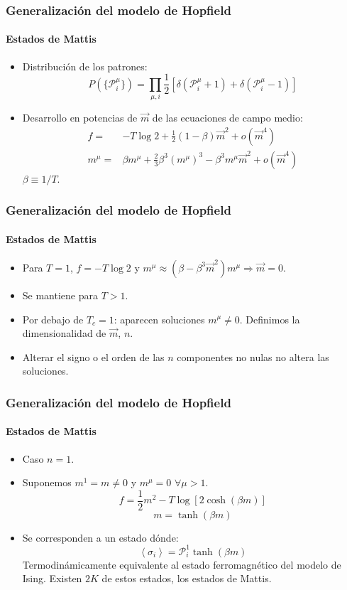 \documentclass[11pt]{beamer}
\begin{document}
\begin{frame}
\frametitle{Generalización del modelo de Hopfield}
\framesubtitle{Estados de Mattis}
\begin{itemize}
	\item Distribución de los patrones:
	\begin{displaymath}
	P(\lbrace\mathcal{P}^\mu_i\rbrace)=\prod_{\mu,i}\frac{1}{2}\left[\delta(\mathcal{P}^\mu_i + 1) + \delta(\mathcal{P}^\mu_i - 1)\right]
	\end{displaymath}
	\item Desarrollo en potencias de $\vec{m}$ de las ecuaciones de campo medio:
	\begin{align*}
	f=&-T\log 2 + \frac{1}{2}(1 - \beta)\vec{m}^2 + o(\vec{m}^4) \label{fseries}\\ m^\mu=&\beta m^\mu + \frac{2}{3}\beta^3 (m^\mu)^3 - \beta^3m^\mu\vec{m}^2 + o(\vec{m}^4)
	\end{align*}
	$\beta\equiv1/T$.
\end{itemize}
\end{frame}

\begin{frame}
\frametitle{Generalización del modelo de Hopfield}
\framesubtitle{Estados de Mattis}
\begin{itemize}
	\item Para $T=1$, $f=-T\log2$ y $m^\mu\approx(\beta-\beta^3\vec{m}^2)m^\mu\Rightarrow\vec{m}=0$.
	\item Se mantiene para $T>1$. 
	\item Por debajo de $T_c=1$: aparecen soluciones $m^\mu\neq0$. Definimos la dimensionalidad de $\vec{m}$, $n$.
	\item Alterar el signo o el orden de las $n$ componentes no nulas no altera las soluciones.
\end{itemize}
\end{frame}

\begin{frame}
\frametitle{Generalización del modelo de Hopfield}
\framesubtitle{Estados de Mattis}
\begin{itemize}
	\item Caso $n=1$.
	\item Suponemos $m^1=m\neq0$ y $m^\mu = 0\,\,\forall \mu>1$.
	\begin{displaymath}
	f=\frac{1}{2}m^2 - T\log\left[2\cosh(\beta m)\right]
	\end{displaymath}
	\begin{displaymath}
	m=\tanh(\beta m)
	\end{displaymath}
	\item Se corresponden a un estado dónde:
	\begin{displaymath}
	\left<\sigma_i\right>=\mathcal{P}_i^1\tanh(\beta m)
	\end{displaymath}
	Termodinámicamente equivalente al estado ferromagnético del modelo de Ising. Existen $2K$ de estos estados, los estados de Mattis.
\end{itemize}
\end{frame}
\end{document}

